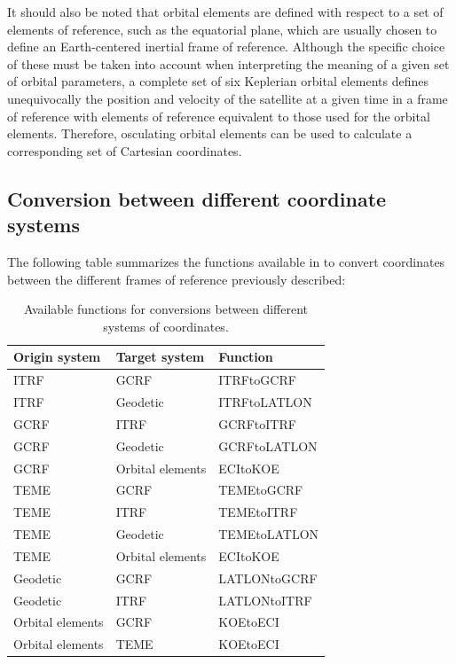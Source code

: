 It should also be noted that orbital elements are defined with respect to a set of elements of reference, such as the equatorial plane, which are usually chosen to define an Earth-centered inertial frame of reference. Although the specific choice of these must be taken into account when interpreting the meaning of a given set of orbital parameters, a complete set of six Keplerian orbital elements defines unequivocally the position and velocity of the satellite at a given time in a frame of reference with elements of reference equivalent to those used for the orbital elements. Therefore, osculating orbital elements can be used to calculate a corresponding set of Cartesian coordinates.

\hypertarget{conversion-between-different-coordinate-systems}{%
\subsection{Conversion between different coordinate systems}\label{conversion-between-different-coordinate-systems}}

The following table summarizes the functions available in  to convert coordinates between the different frames of reference previously described:

\begin{table}

\caption{\label{tab:conversions-table-latex}Available functions for conversions 
                                       between different systems of coordinates.}
\centering
\fontsize{7}{9}\selectfont
\begin{tabular}[t]{l|l|l}
\hline
\textbf{Origin system} & \textbf{Target system} & \textbf{Function}\\
\hline
ITRF & GCRF & ITRFtoGCRF\\
\hline
ITRF & Geodetic & ITRFtoLATLON\\
\hline
GCRF & ITRF & GCRFtoITRF\\
\hline
GCRF & Geodetic & GCRFtoLATLON\\
\hline
GCRF & Orbital elements & ECItoKOE\\
\hline
TEME & GCRF & TEMEtoGCRF\\
\hline
TEME & ITRF & TEMEtoITRF\\
\hline
TEME & Geodetic & TEMEtoLATLON\\
\hline
TEME & Orbital elements & ECItoKOE\\
\hline
Geodetic & GCRF & LATLONtoGCRF\\
\hline
Geodetic & ITRF & LATLONtoITRF\\
\hline
Orbital elements & GCRF & KOEtoECI\\
\hline
Orbital elements & TEME & KOEtoECI\\
\hline
\end{tabular}
\end{table}

